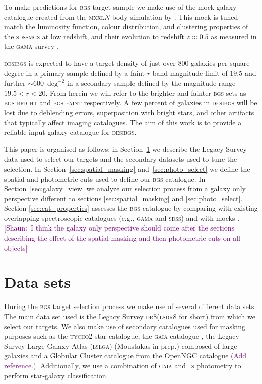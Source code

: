 \documentclass[fleqn,usenatbib]{mnras}
\newcommand{\shaun}[1]{~\newline\noindent \textcolor{Purple}{{ [Shaun:~{#1}]\\}}}
\newcommand{\BGSB}{\textsc{bgs bright}\xspace}
\newcommand{\BGSF}{\textsc{bgs faint}\xspace}
\newcommand{\BGS}{\textsc{bgs}\xspace}
\newcommand{\DESI}{\textsc{desi}\xspace}
\newcommand{\DReight}{\textsc{dr8}\xspace}
\newcommand{\GAMA}{\textsc{gama}\xspace}
\newcommand{\GAIA}{\textsc{gaia}\xspace}
\newcommand{\LS}{\textsc{ls}\xspace}
\newcommand{\LSLGA}{\textsc{lslga}\xspace}
\newcommand{\MGS}{\textsc{mgs}\xspace}
\newcommand{\MXXL}{\textsc{mxxl}\xspace}
\newcommand{\SDSS}{\textsc{sdss}\xspace}
\newcommand{\TYCHO}{\textsc{tycho2}\xspace}
\newcommand{\addref}{\textcolor{purple}{(Add reference.)}}
\begin{document}
To make predictions for \BGS target sample 
we make use of the mock galaxy catalogue created 
from the \MXXL $N$-body simulation  \citep{Angulo2012} by
\cite{Smith:2017tzz}. This mock is tuned match the
 luminosity function,
colour distribution, and clustering properties of the
\SDSS \MGS at low redshift, and their evolution to redshift $z \approx 0.5$ as measured in the \GAMA survey
\citep{2015MNRAS.452.2087L}.

\DESI \BGS is expected to have a target density of just over $800$ galaxies per square degree in a primary sample defined by a faint $r$-band magnitude limit of $19.5$ and further $\sim 600$~$\textrm{deg}^{-2}$ in a secondary sample defined by the magnitude range $19.5 < r < 20$. From herein we will refer to the brighter and fainter \BGS sets as \BGSB and \BGSF respectively. A few percent of galaxies in \DESI \BGS will be lost due to deblending errors, superposition with bright stars, and other artifacts that typically affect imaging catalogues. The aim of this work is to provide a reliable input galaxy catalogue for \DESI \BGS. 



This paper is organised as follows: in Section~\ref{sec:data_sets} we describe the Legacy Survey data used to select our targets and the secondary datasets used to tune the selection. In Section~\ref{sec:spatial_masking} and~\ref{sec:photo_select} we define the spatial and photometric cuts used to define our \BGS catalogue. In Section~\ref{sec:galaxy_view} we analyze our selection process from a galaxy only perspective different to sections \ref{sec:spatial_masking} and \ref{sec:photo_select}. Section \ref{sec:cat_properties} assesses the \BGS catalogue by comparing with existing overlapping spectroscopic catalogues (e.g., \GAMA and \SDSS) and with mocks \citep{Smith:2017tzz}.
\shaun{I think the galaxy only perspective should come after the sections 
describing the effect of the spatial masking and then photometric cuts on all objects}

\section{Data sets}\label{sec:data_sets}


During the \BGS target selection process we make use of several different data sets. The main data set used is the Legacy Survey \DReight (\LS \DReight for short) from which we select our targets. We also make use of secondary catalogues used for masking purposes such as the \TYCHO \citep{2000A&A...355L..27H} star catalogue, 
 the \GAIA catalogue \citep{2016A&A...595A...1G},
the Legacy Survey Large Galaxy Atlas (\LSLGA) (Moustakas in prep.) composed of large galaxies and a Globular Cluster catalogue from the OpenNGC catalogue \addref. Additionally, we use a combination of
\GAIA  and \LS photometry to perform star-galaxy classification.
\end{document}
